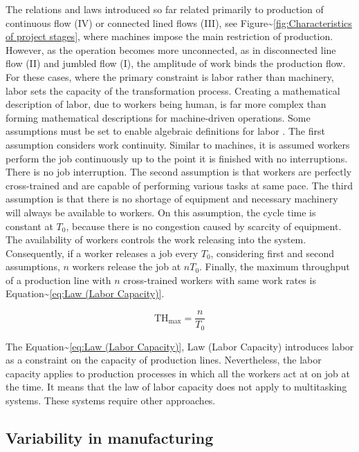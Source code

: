 \documentclass{article}
\begin{document}
The relations and laws introduced so far related primarily to production of continuous flow (IV) or connected lined flows (III), see Figure\textasciitilde{}\ref{fig:Characteristics of project stages}, where machines impose the main restriction of production.
However, as the operation becomes more unconnected, as in disconnected line flow (II) and jumbled flow (I), the amplitude of work binds the production flow.
For these cases, where the primary constraint is labor rather than machinery, labor sets the capacity of the transformation process.
Creating a mathematical description of labor, due to workers being human, is far more complex than forming mathematical descriptions for machine-driven operations.
Some assumptions must be set to enable algebraic definitions for labor \citep[pp.237-238]{Hopp2001}.
The first assumption considers work continuity.
Similar to machines, it is assumed workers perform the job continuously up to the point it is finished with no interruptions.
There is no job interruption.
The second assumption is that workers are perfectly cross-trained and are capable of performing various tasks at same pace.
The third assumption is that there is no shortage of equipment and necessary machinery will always be available to workers.
On this assumption, the cycle time is constant at \(T_0\), because there is no congestion caused by scarcity of equipment.
The availability of workers controls the work releasing into the system.
Consequently, if a worker releases a job every \(T_0\), considering first and second assumptions, \(n\) workers release the job at \(nT_0\).
Finally, the maximum throughput of a production line with \(n\) cross-trained workers with same work rates is Equation\textasciitilde{}\ref{eq:Law (Labor Capacity)}.

\begin{equation}
    \mbox{TH}_{\mbox{max}}=\frac{n}{T_0}
\label{eq:Law (Labor Capacity)}
\end{equation}

The Equation\textasciitilde{}\ref{eq:Law (Labor Capacity)}, Law (Labor Capacity) introduces labor as a constraint on the capacity of production lines.
Nevertheless, the labor capacity applies to production processes in which all the workers act at on job at the time.
It means that the law of labor capacity does not apply to multitasking systems.
These systems require other approaches.

\subsection{Variability in manufacturing}
\end{document}
